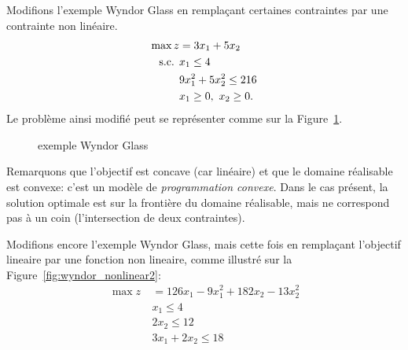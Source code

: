 \begin{example}
Modifions l'exemple Wyndor Glass en remplaçant certaines contraintes par une contrainte non linéaire.
\begin{align*}
\max z &= 3x_1 + 5x_2 \\
\st & x_1 \leq 4 \\
& 9x_1^2+5x_2^2 \leq 216 \\
& x_1 \geq 0,\ x_2 \geq 0.
\end{align*}
Le problème ainsi modifié peut se représenter comme sur la Figure~\ref{fig:wyndor_nonlinear}.
\begin{figure}[htbp]
\begin{center}
\end{center}
\caption{exemple Wyndor Glass}
\label{fig:wyndor_nonlinear}
\end{figure}
Remarquons que l'objectif est concave (car linéaire) et que le domaine réalisable est convexe: c'est un modèle de {\sl programmation convexe}.
Dans le cas présent, la solution optimale est sur la frontière du domaine réalisable, mais ne correspond pas à un coin (l'intersection de deux contraintes).

Modifions encore l'exemple Wyndor Glass, mais cette fois en remplaçant l'objectif lineaire par
une fonction non lineaire, comme illustré sur la Figure~\ref{fig:wyndor_nonlinear2}:
\begin{align*}
\max z\ &= 126x_1-9x_1^2+182x_2-13x_2^2 \\
& x_1 \leq 4 \\
& 2x_2 \leq 12 \\
& 3x_1 + 2x_2 \leq 18
\end{align*}
\begin{figure}[htbp]
\begin{center}
\begin{tikzpicture}[xscale=1.2,scale=0.75,samples=200]


\end{tikzpicture}
\end{center}
\end{figure}
\end{example}
